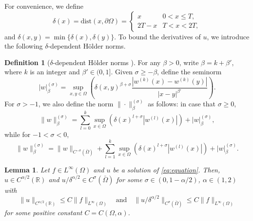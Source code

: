 \documentclass{amsart}
\newtheorem{lemma}[theorem]{Lemma}
\theoremstyle{definition}
\newtheorem{definition}[theorem]{Definition}
\theoremstyle{remark}
\numberwithin{equation}{section}
\begin{document}
For convenience, we define
\begin{equation} \label{def:delta}
  \delta(x) = \text{dist}(x, \partial \Omega) 
  = \begin{cases}
    x    & 0 < x \le T, \\ 
    2T-x & T < x < 2T,
  \end{cases}
\end{equation} 
and \( \delta(x, y) = \min\{\delta(x), \delta(y)\}\). 
To bound the derivatives of $u$,  we introduce the following \(\delta\)-dependent H\"older norms.
\begin{definition}[\(\delta\)-dependent H\"older norms \cite{ROSOTON2014275}]
  \label{def:delta-Holder-norm}
  For any $\beta > 0$, 
  write \(\beta = k + \beta'\), where \(k\) is an integer and \(\beta' \in (0, 1]\).
  Given \(\sigma\ge -\beta\), define the seminorm
  \begin{equation*}
    |w|_{\beta}^{(\sigma)} 
    = \sup_{x,y\in \Omega} \left( \delta(x,y)^{\beta+\sigma}\frac{|w^{(k)}(x)-w^{(k)}(y)|}{|x-y|^{\beta'}} \right).
  \end{equation*}
  For \(\sigma > -1\), we also define the norm \(\|\cdot\|_{\beta}^{(\sigma)}\) as follows: 
  in case that \(\sigma \ge 0\),
  \begin{equation*}
    \|w\|_{\beta}^{(\sigma)} 
    = \sum_{l=0}^{k} \sup_{x\in \Omega} \left( \delta(x)^{l+\sigma} |w^{(l)}(x)| \right) + |w|_{\beta}^{(\sigma)}  ,
  \end{equation*}
  while for \(-1 < \sigma<0\),
  \begin{equation*}
    \|w\|_{\beta}^{(\sigma)}
    = \|w\|_{C^{-\sigma}(\bar{\Omega})} + \sum_{l=1}^{k} \sup_{x\in \Omega} \left( \delta(x)^{l+\sigma} |w^{(l)} (x)| \right) + |w|_{\beta}^{(\sigma)} .
  \end{equation*}
\end{definition}


\begin{lemma} \cite[pp.\,276-277]{ROSOTON2014275}
  \label{thm:Xacier1.2}
  Let \(f\in L^\infty(\Omega)\) and \(u\) be a solution of \eqref{eq:equation}.
  Then, \(u\in C^{\alpha/2}(\mathbb{R})\) and  \(u/\delta^{\alpha/2}\in C^\sigma(\bar{\Omega})\) for some \(\sigma \in (0, 1-\alpha/2)\), \(\alpha\in (1,2)\) with
  \begin{equation*}
    \|u\|_{C^{\alpha/2}(\mathbb{R})}\le C\|f\|_{L^\infty(\Omega)}
    \quad \text{and} \quad 
    \|u/\delta^{\alpha/2}\|_{C^\sigma(\bar{\Omega})} \le C \|f\|_{L^\infty(\Omega)}
  \end{equation*}
  for some positive constant \(C=C(\Omega, \alpha)\).
\end{lemma}
\end{document}
